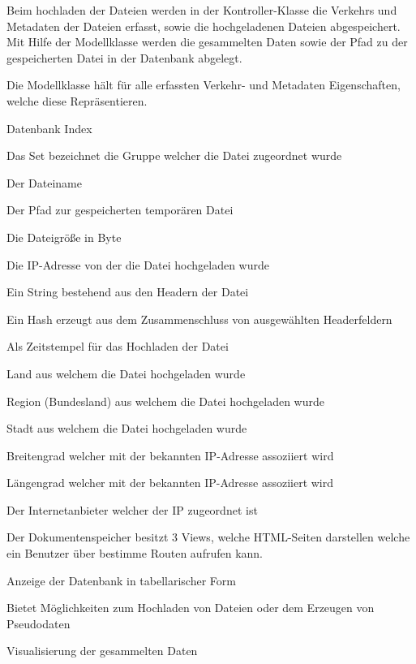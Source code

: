 \documentclass[
    fontsize=12pt,
    headings=small,
    parskip=half,           %
    bibliography=totoc,
    numbers=noenddot,       %
    open=any,               %
    ]{scrreprt}
\begin{document}
Beim hochladen der Dateien werden in der Kontroller-Klasse die Verkehrs und Metadaten der Dateien erfasst, sowie die hochgeladenen Dateien abgespeichert.
Mit Hilfe der Modellklasse werden die gesammelten Daten sowie der Pfad zu der gespeicherten Datei in der Datenbank abgelegt.

Die Modellklasse hält für alle erfassten Verkehr- und Metadaten Eigenschaften, welche diese Repräsentieren. 
 
\begin{description}[style=nextline]
\item[ID] Datenbank Index
\item[Set] Das Set bezeichnet die Gruppe welcher die Datei zugeordnet wurde
\item[Filename] Der Dateiname
\item[Filepath] Der Pfad zur gespeicherten temporären Datei
\item[Size] Die Dateigröße in Byte
\item[IPAddress] Die IP-Adresse von der die Datei hochgeladen wurde
\item[Headers] Ein String bestehend aus den Headern der Datei
\item[HeaderFingerprint] Ein Hash erzeugt aus dem Zusammenschluss von ausgewählten Headerfeldern
\item[DateTime] Als Zeitstempel für das Hochladen der Datei
\item[Country] Land aus welchem die Datei hochgeladen wurde
\item[RegionName] Region (Bundesland) aus welchem die Datei hochgeladen wurde
\item[City] Stadt aus welchem die Datei hochgeladen wurde
\item[Lat] Breitengrad welcher mit der bekannten IP-Adresse assoziiert wird
\item[Lon] Längengrad welcher mit der bekannten IP-Adresse assoziiert wird
\item[ISP] Der Internetanbieter welcher der IP zugeordnet ist
\end{description}

Der Dokumentenspeicher besitzt 3 Views, welche HTML-Seiten darstellen welche ein Benutzer über bestimme Routen aufrufen kann. 

\begin{description}[style=nextline] 
\item[/FileEntry] Anzeige der Datenbank in tabellarischer Form
\item[/FileEntryCreate] Bietet Möglichkeiten zum Hochladen von Dateien oder dem Erzeugen von Pseudodaten
\item[/FileEntryVisual] Visualisierung der gesammelten Daten
\end{description}
\end{document}
